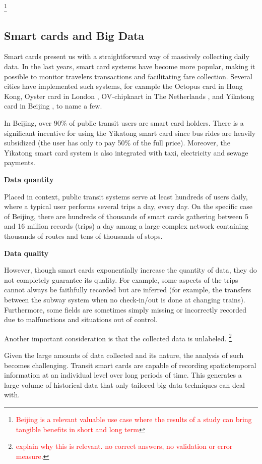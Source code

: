 \documentclass{article}
\newcommand{\selfnote}[1]{\footnote{\textcolor{red}{#1}}}
\begin{document}
\selfnote{Beijing is a relevant valuable use case where the results of a study can bring tangible benefits in short and long term}

\subsection{Smart cards and Big Data}
Smart cards present us with a straightforward way of massively collecting daily data. In the last years, smart card systems have become more popular, making it possible to monitor travelers transactions and facilitating fare collection. Several cities have implemented such systems, for example the Octopus card in Hong Kong\cite{chau2003octopus}, Oyster card in London \cite{blythe2004improving}, OV-chipkaart in The Netherlands \cite{de2008analysis}, and Yikatong card in Beijing \cite{chan2010tactical}, to name a few.

In Beijing, over 90\% of public transit users are smart card holders. There is a significant incentive for using the Yikatong smart card since bus rides are heavily subsidized (the user has only to pay 50\% of the full price)\cite{ma2017understanding}. Moreover, the Yikatong smart card system is also integrated with taxi, electricity and sewage payments. 

\textbf{Data quantity}

Placed in context, public transit systems serve at least hundreds of users daily, where a typical user performs several trips a day, every day. On the specific case of Beijing, there are hundreds of thousands of smart cards gathering between 5 and 16 million records (trips) a day among a large complex network containing thousands of routes and tens of thousands of stops. 

\textbf{Data quality}

However, though smart cards exponentially increase the quantity of data, they do not completely guarantee its quality. For example, some aspects of the trips cannot always be faithfully recorded but are inferred (for example, the transfers between the subway system when no check-in/out is done at changing trains). Furthermore, some fields are sometimes simply missing or incorrectly recorded due to malfunctions and situations out of control. 

Another important consideration is that the collected data is unlabeled. \selfnote{explain why this is relevant. no correct answers, no validation or error measure.}


Given the large amounts of data collected and its nature, the analysis of such becomes challenging. Transit smart cards are capable of recording spatiotemporal information at an individual level over long periods of time. This generates a large volume of historical data that only tailored big data techniques can deal with. 
\end{document}
